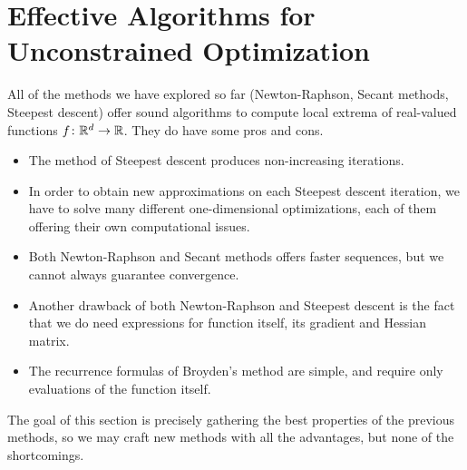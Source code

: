 
\section{Effective Algorithms for Unconstrained Optimization}
All of the methods we have explored so far (Newton-Raphson, Secant methods, Steepest descent) offer sound algorithms to compute local extrema of real-valued functions $f \colon \mathbb{R}^d \to \mathbb{R}$. They do have some pros and cons.  
\begin{itemize}
	\item The method of Steepest descent produces non-increasing iterations.
	\item In order to obtain new approximations on each Steepest descent iteration, we have to solve many different one-dimensional optimizations, each of them offering their own computational issues. 
	\item Both Newton-Raphson and Secant methods offers faster sequences, but we cannot always guarantee convergence.  
	\item Another drawback of both Newton-Raphson and Steepest descent is the fact that we do need expressions for function itself, its gradient and Hessian matrix.  
	\item The recurrence formulas of Broyden's method are simple, and require only evaluations of the function itself.
\end{itemize}

The goal of this section is precisely gathering the best properties of the previous methods, so we may craft new methods with all the advantages, but none of the shortcomings.  

\separator

